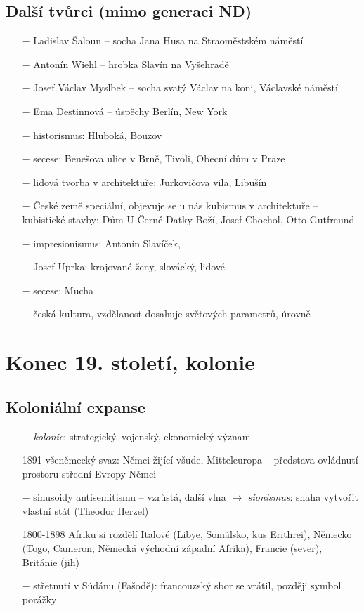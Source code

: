 \documentclass{article}
\begin{document}
\subsection*{Další tvůrci (mimo generaci ND)}
\begin{itemize}
    \vspace{-0.5em}
    \setlength\itemsep{0.15em}
    \item[$-$] Ladislav Šaloun -- socha Jana Husa na Straoměstském náměstí
    \item[$-$] Antonín Wiehl -- hrobka Slavín na Vyšehradě
    \item[$-$] Josef Václav Myslbek -- socha svatý Václav na koni, Václavské náměstí
    \item[$-$] Ema Destinnová -- úspěchy Berlín, New York
    \item[$-$] historismus: Hluboká, Bouzov
    \item[$-$] secese: Benešova ulice v Brně, Tivoli, Obecní dům v Praze
    \item[$-$] lidová tvorba v architektuře: Jurkovičova vila, Libušín
    \item[$-$] České země speciální, objevuje se u nás kubismus v architektuře -- kubistické stavby: Dům U Černé Datky Boží, Josef Chochol, Otto Gutfreund
    \item[$-$] impresionismus: Antonín Slavíček,
    \item[$-$] Josef Uprka: krojované ženy, slovácký, lidové
    \item[$-$] secese: Mucha
    \item[$-$] česká kultura, vzdělanost dosahuje světových parametrů, úrovně
\end{itemize}

\section*{Konec 19. století, kolonie}

\subsection*{Koloniální expanse}
\begin{itemize}
    \vspace{-0.5em}
    \setlength\itemsep{0.15em}
    \item[$-$] \textit{kolonie}: strategický, vojenský, ekonomický význam
    \item[1891] všeněmecký svaz: Němci žijící všude, Mitteleuropa -- představa ovládnutí prostoru střední Evropy Němci
    \item[$-$] sinusoidy antisemitismu -- vzrůstá, další vlna $\rightarrow$  \textit{sionismus}: snaha vytvořit vlastní stát (Theodor Herzel)
    \item[1800-1898] Afriku si rozdělí Italové (Libye, Somálsko, kus Erithrei), Německo (Togo, Cameron, Německá východní  západní Afrika), Francie (sever), Británie (jih)
    \item[$-$] střetnutí v Súdánu (Fašodě): francouzský sbor se vrátil, později symbol porážky
\end{itemize}
\end{document}

